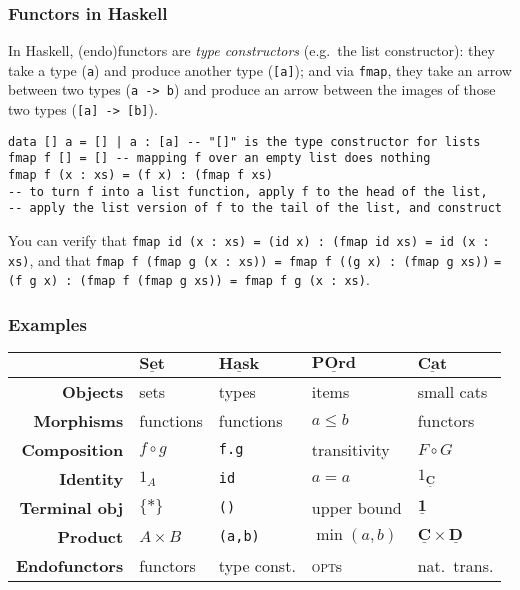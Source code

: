 \documentclass[10pt]{beamer}
\newcommand{\Cat}[1]{\ensuremath{\underline{\mathbf{#1}}}}
\theoremstyle{definition}
\theoremstyle{remark}
\numberwithin{equation}{section}
\begin{document}
\begin{frame}
  \frametitle{Functors in Haskell}

  In Haskell, (endo)functors are \emph{type constructors} (e.g.\ the list
  constructor): they take a type (\lstinline{a}) and produce another type (\lstinline{[a]}); and via \lstinline{fmap}, they take an arrow between two
  types (\lstinline{a -> b}) and produce an arrow between the images of those
  two types (\lstinline{[a] -> [b]}).

\begin{lstlisting}[frame=single]
data [] a = [] | a : [a] -- "[]" is the type constructor for lists
fmap f [] = [] -- mapping f over an empty list does nothing
fmap f (x : xs) = (f x) : (fmap f xs)
-- to turn f into a list function, apply f to the head of the list,
-- apply the list version of f to the tail of the list, and construct
\end{lstlisting}

  You can verify that
  \lstinline{fmap id (x : xs) = (id x) : (fmap id xs) = id (x : xs)}, and that
  \lstinline{fmap f (fmap g (x : xs)) = fmap f ((g x) : (fmap g xs))}
  \lstinline{= (f g x) : (fmap f (fmap g xs)) = fmap f g (x : xs)}.
\end{frame}

\begin{frame}[fragile]
  \frametitle{Examples}
  \begin{tabular}{r l l l l}\toprule
    & $\Cat{Set}$ & $\Cat{Hask}$ & $\Cat{POrd}$ & $\Cat{Cat}$ \\\midrule
    \textbf{Objects} & sets & types & items & small cats \\
    \textbf{Morphisms} & functions & functions & $a \leq b$ & functors \\
    \textbf{Composition} & $f \circ g$ & \lstinline!f.g! & transitivity & $F \circ G$ \\
    \textbf{Identity} & $1_A$ & {\lstinline!id!} & $a = a$ & $1_{\Cat{C}}$ \\
    \textbf{Terminal obj\rlap{.}} & $\{*\}$ & \lstinline!()! & upper bound & $\Cat{1}$ \\
    \textbf{Product} & $A \times B$ & \lstinline!(a,b)! & $\min(a,b)$ & $\Cat{C} \times \Cat{D}$ \\
    \textbf{Endofunctors} & functors & type const. & \textsc{opt}s & nat.\ trans.\\\bottomrule
  \end{tabular}
\end{frame}
\end{document}
